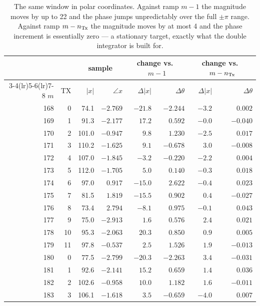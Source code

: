 \begin{table}[t]
\centering
\caption[Why the two lags differ]{The same window in polar coordinates. Against
ramp $m-1$ the magnitude moves by up to \num{22} and the phase jumps
unpredictably over the full $\pm\pi$ range. Against ramp $m-n_{\mathrm{Tx}}$ the
magnitude moves by at most \num{4} and the phase increment is essentially zero
--- a stationary target, exactly what the double integrator is built for.}
\label{tab:workedpolar}
\small
\setlength{\tabcolsep}{6pt}
\begin{tabular}{@{}rr rr @{\hskip 12pt} rr @{\hskip 12pt} rr@{}}
\toprule
& & \multicolumn{2}{c}{sample}
  & \multicolumn{2}{c}{change vs.\ $m-1$}
  & \multicolumn{2}{c}{change vs.\ $m-n_{\mathrm{Tx}}$}\\
\cmidrule(lr){3-4}\cmidrule(lr){5-6}\cmidrule(lr){7-8}
$m$ & TX & $|x|$ & $\angle x$ & $\Delta|x|$ & $\Delta\theta$ & $\Delta|x|$ & $\Delta\theta$\\
\midrule
168 & 0  & 74.1  & $-2.769$ & $-21.8$ & $-2.244$ & $-3.2$ & $\phantom{-}0.002$\\
169 & 1  & 91.3  & $-2.177$ & $17.2$  & $0.592$  & $-0.0$ & $-0.040$\\
170 & 2  & 101.0 & $-0.947$ & $9.8$   & $1.230$  & $-2.5$ & $\phantom{-}0.017$\\
171 & 3  & 110.2 & $-1.625$ & $9.1$   & $-0.678$ & $3.0$  & $-0.008$\\
172 & 4  & 107.0 & $-1.845$ & $-3.2$  & $-0.220$ & $-2.2$ & $\phantom{-}0.004$\\
173 & 5  & 112.0 & $-1.705$ & $5.0$   & $0.140$  & $-0.3$ & $\phantom{-}0.018$\\
174 & 6  & 97.0  & $0.917$  & $-15.0$ & $2.622$  & $-0.4$ & $\phantom{-}0.023$\\
175 & 7  & 81.5  & $1.819$  & $-15.5$ & $0.902$  & $0.4$  & $-0.027$\\
176 & 8  & 73.4  & $2.794$  & $-8.1$  & $0.975$  & $-0.1$ & $\phantom{-}0.043$\\
177 & 9  & 75.0  & $-2.913$ & $1.6$   & $0.576$  & $2.4$  & $\phantom{-}0.021$\\
178 & 10 & 95.3  & $-2.063$ & $20.3$  & $0.850$  & $0.9$  & $\phantom{-}0.005$\\
179 & 11 & 97.8  & $-0.537$ & $2.5$   & $1.526$  & $1.9$  & $-0.013$\\
180 & 0  & 77.5  & $-2.799$ & $-20.3$ & $-2.263$ & $3.4$  & $-0.031$\\
181 & 1  & 92.6  & $-2.141$ & $15.2$  & $0.659$  & $1.4$  & $\phantom{-}0.036$\\
182 & 2  & 102.6 & $-0.958$ & $10.0$  & $1.182$  & $1.6$  & $-0.011$\\
183 & 3  & 106.1 & $-1.618$ & $3.5$   & $-0.659$ & $-4.0$ & $\phantom{-}0.007$\\
\bottomrule
\end{tabular}
\end{table}


